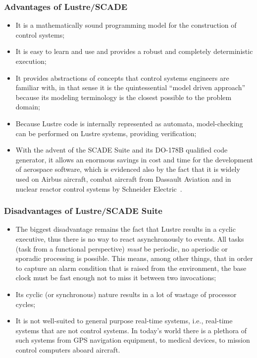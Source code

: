 \subsubsection{Advantages of Lustre/SCADE}
\begin{itemize}
\item{It is a mathematically sound programming model for the
  construction of control systems;}
\item{It is easy to learn and use and provides a robust and completely
  deterministic execution;}
\item{It provides abstractions of concepts that control systems
  engineers are familiar with, in that sense it is the quintessential
  ``model driven approach'' because its modeling terminology is the
  closest possible to the problem domain;}
\item{Because Lustre code is internally represented as automata,
  model-checking can be performed on Lustre systems, providing
  verification;}
\item{With the advent of the SCADE Suite and its DO-178B qualified
  code generator, it allows an enormous savings in cost and time for
  the development of aerospace software, which is evidenced also by
  the fact that it is widely used on Airbus aircraft, combat aircraft
  from Dassault Aviation and in nuclear reactor control systems by
  Schneider Electric~\cite{halbwachs@ieee03}.}
\end{itemize}

\subsubsection{Disadvantages of Lustre/SCADE Suite}
\begin{itemize}
\item{The biggest disadvantage remains the fact that Lustre results in
  a cyclic executive, thus there is no way to react asynchronously to
  events. All tasks (task from a functional perspective) \emph{must}
  be periodic, no aperiodic or sporadic processing is possible. This
  means, among other things, that in order to capture an alarm
  condition that is raised from the environment, the base clock must
  be fast enough not to miss it between two invocations;}
\item{Its cyclic (or synchronous) nature results in a lot of wastage
  of processor cycles;}
\item{It is not well-suited to general purpose real-time systems,
  i.e., real-time systems that are not control systems. In today's
  world there is a plethora of such systems from GPS navigation
  equipment, to medical devices, to mission control computers aboard
  aircraft.}
\end{itemize}

